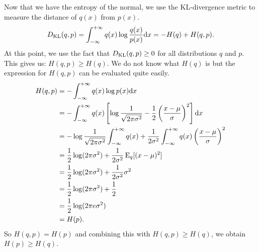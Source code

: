 Now that we have the entropy of the normal, we use the KL-divergence metric 
to measure the distance of $q(x)$ from $p(x)$. 
\begin{align*}
    D_{\text{KL}} (q, p) = \int_{- \infty}^{+ \infty} q(x) \log \frac{q(x)}{p(x)} \mathrm{d} x = - H(q) + H(q, p).
\end{align*}
At this point, we use the fact that $D_{\text{KL}} (q, p) \geq 0$ for all distributions $q$ and $p$.
This gives us: $H(q, p) \geq H(q)$. We do not know what $H(q)$ is but the expression 
for $H(q, p)$ can be evaluated quite easily.
\begin{align*}
    H(q, p) & = - \int_{- \infty}^{+ \infty} q(x) \log p(x) \mathrm{d} x \\
            & =  - \int_{- \infty}^{+ \infty} q(x) 
                \left [ \log \frac{1}{\sqrt{2 \pi \sigma^2}} 
                - \frac{1}{2} \left ( \frac{x - \mu}{\sigma} \right )^2 \right ] \mathrm{d} x \\
            & = - \log \frac{1}{\sqrt{2 \pi \sigma^2}}  \int_{- \infty}^{+ \infty} q(x)  + 
                \frac{1}{2 \sigma^2} \int_{- \infty}^{+ \infty} q(x) \left ( \frac{x - \mu}{\sigma} \right )^2 \\
            & = \frac{1}{2} \log (2 \pi \sigma^2) + \frac{1}{2 \sigma^2} \operatorname{E}_{q} [(x - \mu)^2] \\
            & = \frac{1}{2} \log (2 \pi \sigma^2) + \frac{1}{2 \sigma^2} \sigma^2 \\
            & = \frac{1}{2} \log (2 \pi \sigma^2) + \frac{1}{2} \\
            & = \frac{1}{2} \log (2 \pi e \sigma^2) \\
            & = H(p).
\end{align*}
So $H(q, p) = H(p)$ and combining this with $H(q, p) \geq H(q)$, we 
obtain $H(p) \geq H(q)$.
